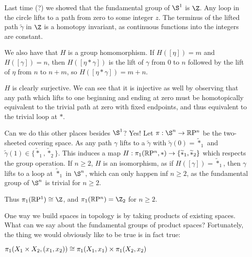 
Last time (?) we showed that the fundamental group of $\S^1$ is $\Z$.  Any loop in the circle lifts to a path from zero to some integer $z$.  The terminus of the lifted path $\widetilde{\gamma}$ in $\Z$ is a homotopy invariant, as continuous functions into the integers are constant.

	
We also have that $H$ is a group homomorphism.  If $H([\eta])=m$ and $H([\gamma])=n$, then $H([\eta\ast\gamma])$ is the lift of $\gamma$ from $0$ to $n$ followed by the lift of $\eta$ from $n$ to $n+m$, so $H([\eta\ast\gamma])=m+n$.

$H$ is clearly surjective.  We can see that it is injective as well by observing that any path which lifts to one beginning and ending at zero must be homotopically equivalent to the trivial path at zero with fixed endpoints, and thus equivalent to the trivial loop at $\ast$.

Can we do this other places besides $\S^1$? Yes!  Let $\pi:\S^n\rightarrow \RP^n$ be the two-sheeted covering space.  As any path $\gamma$ lifts to a $\widetilde{\gamma}$ with $\widetilde{\gamma}(0)=\widetilde{\ast}_1$ and $\widetilde{\gamma}(1)\in\{\widetilde{\ast}_1,\widetilde{\ast}_2\}$.  This induces a map $H:\pi_1(\mathbb{R}\mathrm{P}^n,\ast)\rightarrow\{\widetilde{\ast}_1,\widetilde{\ast}_2\}$ which respects the group operation.  If $n\geq 2$, $H$ is an isomorphism, as if $H([\gamma])=\widetilde{\ast}_1$, then $\gamma$ lifts to a loop at $\widetilde{\ast}_1$ in $\S^n$, which can only happen inf $n\geq 2$, as the fundamental group of $\S^n$ is trivial for $n\geq 2$.  

Thus $\pi_1(\RP^1)\iso \Z$, and $\pi_1(\RP^n)=\Z_2$ for $n\geq 2$.

One way we build spaces in topology is by taking products of existing spaces.  What can we say about the fundamental groups of product spaces? Fortunately, the thing we would obviously like to be true is in fact true:

\begin{theorem}
	$\pi_1(X_1\times X_2,(x_1,x_2)) \cong \pi_1(X_1,x_1)\times \pi_1(X_2,x_2)$
\end{theorem}

